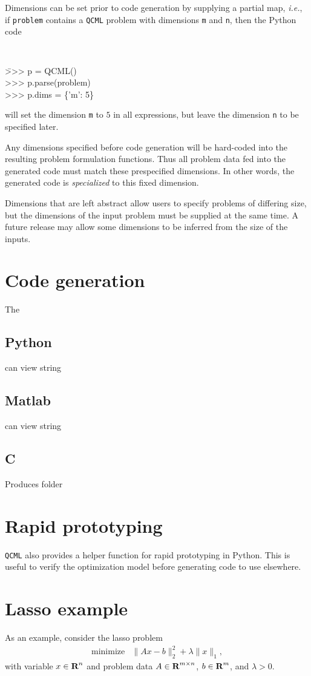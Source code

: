 \documentclass[11pt]{article}
\def\qcml{\texttt{QCML}\xspace}
\newcommand{\ie}{{\it i.e.}}
\newcommand{\reals}{{\mbox{\bf R}}}
\begin{document}
Dimensions can be set prior to code generation by supplying
a partial map, \ie, if {\tt problem} contains a \qcml problem with 
dimensions \texttt{m} and \texttt{n}, then the Python code
{\tt
\begin{tabbing}
  \qquad \= >>> p = QCML() \\
  \> >>> p.parse(problem) \\
  \> >>> p.dims = \{'m': 5\}
\end{tabbing}
}
\noindent will set the dimension {\tt m} to $5$ in all expressions, but leave 
the dimension {\tt n} to be specified later.

Any dimensions specified before code generation will be hard-coded into the
resulting problem formulation functions. Thus all problem data fed into the
generated code must match these prespecified dimensions. In other words, the
generated code is \emph{specialized} to this fixed dimension.

Dimensions that are left abstract allow users to specify problems of
differing size, but the dimensions of the input problem must be supplied at
the same time. A future release may allow some dimensions to be inferred from
the size of the inputs.

\section{Code generation}
The 
\subsection{Python}
can view string
\subsection{Matlab}
can view string
\subsection{C}
Produces folder

\section{Rapid prototyping}
\qcml also provides a helper function for rapid prototyping in Python. This
is useful to verify the optimization model before generating code to use
elsewhere.

\section{Lasso example}
As an example, consider the lasso problem
\[
\begin{array}{ll}
  \mbox{minimize} & \|Ax - b\|_2^2 + \lambda \|x\|_1,
\end{array}
\]
with variable $x \in \reals^n$ and problem data $A\in\reals^{m\times n}$, 
$b \in \reals^m$, and $\lambda > 0$.
\end{document}
